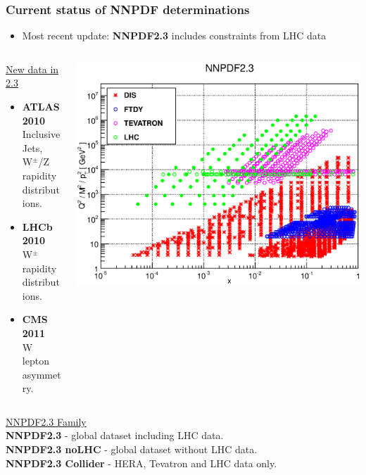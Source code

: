 \documentclass[10pt]{beamer}
\begin{document}
\begin{frame}
\frametitle{Current status of NNPDF determinations}

\begin{itemize}
 \item<1->{  \small Most recent update: \textbf{NNPDF2.3} includes constraints from LHC data}\vskip10pt
 \end{itemize}

\begin{columns}
  \begin{column}{0.4\textwidth}  \vskip-20pt
  \underline{New data in 2.3}
  \vskip2pt
\begin{itemize}
\item<1->{ \small \textbf{ATLAS 2010} \\Inclusive Jets, \\W$^{\pm}$/Z rapidity distributions. }
\item<1->{ \small \textbf{LHCb 2010} \\W$^{\pm}$ rapidity distributions. }
\item<1->{ \small \textbf{CMS  2011} \\W lepton asymmetry.}
\end{itemize}
   \end{column}

   \begin{column}{0.6\textwidth}
      \includegraphics[width=1.0\textwidth]{kin23}

   \end{column}
\end{columns}

\small{
\underline{NNPDF2.3 Family}\\
\vskip5pt
\textbf{NNPDF2.3} - global dataset including LHC data.\\
\textbf{NNPDF2.3 noLHC} - global dataset without LHC data.\\
\textbf{NNPDF2.3 Collider} - HERA, Tevatron and LHC data only.\\}

\end{frame}
\end{document}

